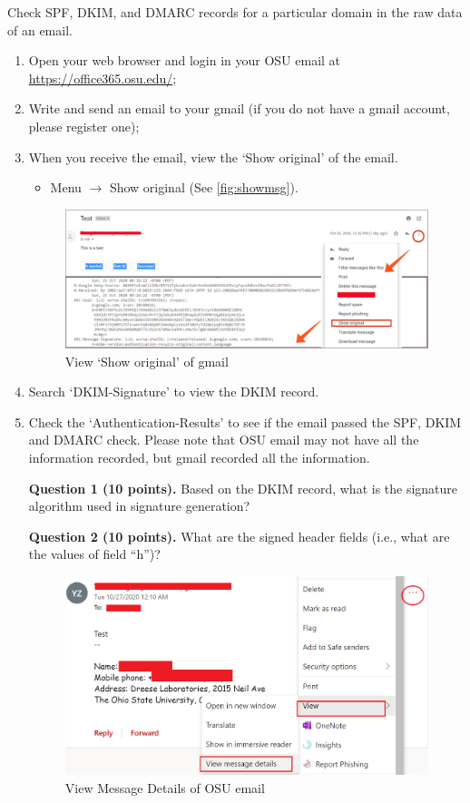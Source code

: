 \documentclass[11pt]{article}
\newcommand{\dmark}{{\sf DMARC}\xspace}
\newcommand{\dkim}{{\sf DKIM}\xspace}
\newcommand{\spf}{{\sf SPF}\xspace}
\begin{document}
Check \spf, \dkim, and \dmark records for a particular domain in the raw data of an email.
\begin{enumerate}
\item Open your web browser and login in your OSU email at \url{https://office365.osu.edu/};
\item Write and send an email to your gmail (if you do not have a gmail account, please register one);
\item When you receive the email, view the ‘Show original’ of the email. 
\begin{itemize}
\item Menu $\rightarrow$ Show original (See \autoref{fig:showmsg}).
\end{itemize}

\begin{figure} [h]
\centering
\vspace{-2mm}
\includegraphics[width=0.88\columnwidth]{dkim.pdf}
\caption{View ‘Show original’ of gmail}\label{fig:showmsg}
\end{figure}

\item Search `DKIM-Signature' to view the \dkim record. 
\item Check the `Authentication-Results' to see if the email passed the \spf, \dkim and \dmark check. Please note that OSU email may not have all the information recorded, but gmail recorded all the information. 

\textbf{Question 1 (10 points).} Based on the \dkim record, what is the signature algorithm used in signature generation?

\textbf{Question 2 (10 points).} What are the signed header fields (i.e., what are the values of field ``h'')?

\begin{figure} [h]
\centering
\vspace{-2mm}
\includegraphics[width=0.7\columnwidth]{dkim2}
\caption{View Message Details of OSU email}\label{fig:showmsg2}
\end{figure}  


\end{enumerate}
\end{document}
